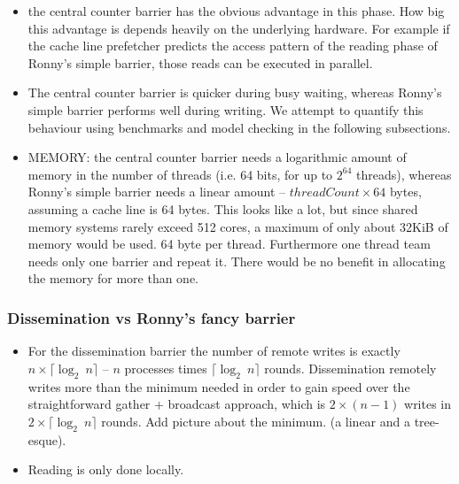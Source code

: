 \documentclass[a4paper, 10pt]{article}
\begin{document}
\begin{enumerate}
\begin{itemize}
	\item the central counter barrier has the obvious advantage in this phase. How big this advantage is depends heavily on the underlying hardware. For example if the cache line prefetcher predicts the access pattern of the reading phase of Ronny's simple barrier, those reads can be executed in parallel.
	\item The central counter barrier is quicker during busy waiting, whereas Ronny's simple barrier performs well during writing. We attempt to quantify this behaviour using benchmarks and model checking in the following subsections.
	\item MEMORY: the central counter barrier needs a logarithmic amount of memory in the number of threads (i.e. 64 bits, for up to $2^{64}$ threads), whereas Ronny's simple barrier needs a linear amount -- $\mathit{threadCount} \times 64$ bytes, assuming a cache line is 64 bytes. This looks like a lot, but since shared memory systems rarely exceed 512 cores, a maximum of only about 32KiB of memory would be used. 64 byte per thread. Furthermore one thread team needs only one barrier and repeat it. There would be no benefit in allocating the memory for more than one.
\end{itemize}

\subsubsection{Dissemination vs Ronny's fancy barrier}
\label{sssec:analysis-general-distributed}
\begin{itemize}
	\item For the dissemination barrier the number of remote writes is exactly $n \times \lceil \log _2~n \rceil$ -- $n$ processes times $\lceil \log _2~n \rceil$ rounds. Dissemination remotely writes more than the minimum needed in order to gain speed over the straightforward gather + broadcast approach, which is $2 \times (n-1)$ writes in $2 \times  \lceil \log _2~n \rceil$ rounds. Add picture about the minimum. (a linear and a tree-esque).
	\item Reading is only done locally.



\end{itemize}
\end{enumerate}
\end{document}
